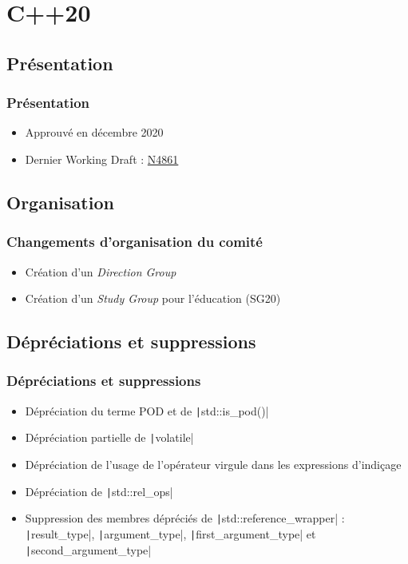 \documentclass[C++.tex]{subfiles}
\begin{document}
\section{C++20}
\subsection*{Présentation}
\begin{frame}
	\frametitle{Présentation}
	\begin{itemize}
		\item Approuvé en décembre 2020
		\item Dernier Working Draft : \href{https://github.com/cplusplus/draft/releases/download/n4861/n4861.pdf}{N4861\linklogo}
	\end{itemize}
\end{frame}

\subsection*{Organisation}
\begin{frame}
	\frametitle{Changements d'organisation du comité}
	\begin{itemize}
		\item Création d'un \textit{Direction Group}
		\item Création d'un \textit{Study Group} pour l'éducation (SG20)
	\end{itemize}

	\centering
\end{frame}

\subsection*{Dépréciations et suppressions}
\begin{frame}[fragile]
	\frametitle{Dépréciations et suppressions}
	\begin{itemize}
		\item Dépréciation du terme POD et de \texttt|std::is_pod()|
		\item Dépréciation partielle de \texttt|volatile|
		\item Dépréciation de l'usage de l'opérateur virgule dans les expressions d'indiçage


		\item Dépréciation de \texttt|std::rel_ops|
		\item Suppression des membres dépréciés de \texttt|std::reference_wrapper| : \texttt|result_type|, \texttt|argument_type|, \texttt|first_argument_type| et \texttt|second_argument_type|
	\end{itemize}
\end{frame}
\end{document}
